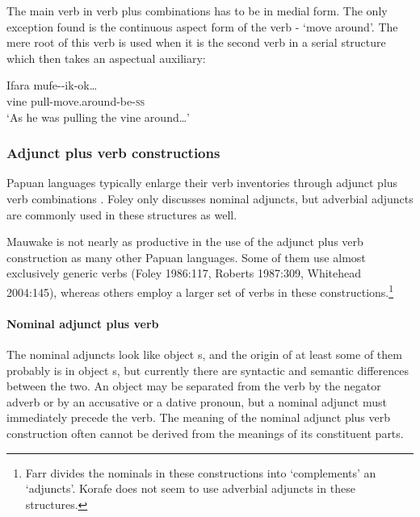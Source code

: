 The main verb in verb plus  combinations has to be in medial form. The only exception found is the continuous aspect form of the verb - `move around'. The mere root of this verb is used when it is the second verb in a serial structure which then takes an aspectual auxiliary:

\ea%
\label{ex:x391}
\gll Ifara mufe--ik-ok{\dots} \\
vine pull-move.around-be-\textsc{ss} \\
\glt`As he was pulling the vine around{\dots}'
\z

\subsubsection[Adjunct plus verb constructions ]{Adjunct plus verb constructions} 
{}
Papuan languages typically enlarge their verb inventories through adjunct plus verb combinations \citep[127]{Foley1986}. Foley only discusses nominal adjuncts, but adverbial adjuncts are commonly used in these structures as well. 

Mauwake is not nearly as productive in the use of the adjunct plus verb construction as many other Papuan languages. Some of them use almost exclusively generic verbs (Foley 1986:117, Roberts 1987:309, Whitehead 2004:145), whereas others employ a larger set of verbs \citep[62--66]{Farr1999} in these constructions.\footnote{Farr divides the nominals in these constructions into `complements' an `adjuncts'. Korafe does not seem to use adverbial adjuncts in these structures. } 

\paragraph[Nominal adjunct plus verb]{Nominal adjunct plus verb}
{}
The nominal adjuncts look like object s, and the origin of at least some of them probably is in object s, but currently there are syntactic and semantic differences between the two. An object  may be separated from the verb by the negator adverb  or by an accusative or a dative pronoun, but a nominal adjunct must immediately precede the verb. The meaning of the nominal adjunct plus verb construction often cannot be derived from the meanings of its constituent parts. 

